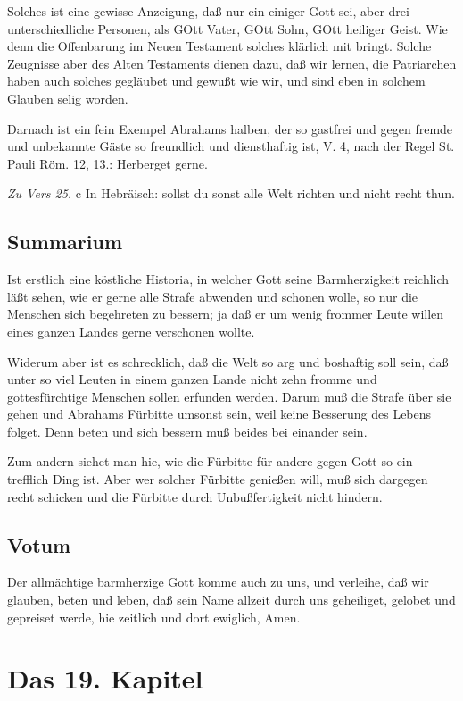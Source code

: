 Solches ist eine gewisse Anzeigung, daß nur ein einiger Gott sei, aber drei unterschiedliche Personen, als GOtt Vater, GOtt Sohn, GOtt heiliger Geist. Wie denn die Offenbarung im Neuen Testament solches klärlich mit bringt. Solche Zeugnisse aber des Alten Testaments dienen dazu, daß wir lernen, die Patriarchen haben auch solches gegläubet und gewußt wie wir, und sind eben in solchem Glauben selig worden.

Darnach ist ein fein Exempel Abrahams halben, der so gastfrei und gegen fremde und unbekannte Gäste so freundlich und diensthaftig ist, V. 4, nach der Regel St. Pauli Röm. 12, 13.: Herberget gerne.

\emph{Zu Vers 25.} c In Hebräisch: sollst du sonst alle Welt richten und nicht recht thun.

\section{Summarium}

Ist erstlich eine köstliche Historia, in welcher Gott seine Barmherzigkeit reichlich läßt sehen, wie er gerne alle Strafe abwenden und schonen wolle, so nur die Menschen sich begehreten zu bessern; ja daß er um wenig frommer Leute willen eines ganzen Landes gerne verschonen wollte.

Widerum aber ist es schrecklich, daß die Welt so arg und boshaftig soll sein, daß unter so viel Leuten in einem ganzen Lande nicht zehn fromme und gottesfürchtige Menschen sollen erfunden werden. Darum muß die Strafe über sie gehen und Abrahams Fürbitte umsonst sein, weil keine Besserung des Lebens folget. Denn beten und sich bessern muß beides bei einander sein.

Zum andern siehet man hie, wie die Fürbitte für andere gegen Gott so ein trefflich Ding ist. Aber wer solcher Fürbitte genießen will, muß sich dargegen recht schicken und die Fürbitte durch Unbußfertigkeit nicht hindern.

\section{Votum}

Der allmächtige barmherzige Gott komme auch zu uns, und verleihe, daß wir glauben, beten und leben, daß sein Name allzeit durch uns geheiliget, gelobet und gepreiset werde, hie zeitlich und dort ewiglich, Amen.

\chapter{Das 19. Kapitel}

